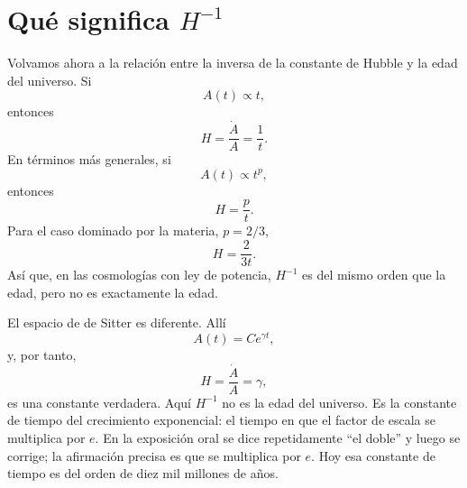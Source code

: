 \section{Qué significa \(H^{-1}\)}

Volvamos ahora a la relación entre la inversa de la constante de Hubble y la edad del universo. Si
\begin{equation}
A(t)\propto t,
\end{equation}
entonces
\begin{equation}
H=\frac{\dot A}{A}=\frac{1}{t}.
\end{equation}
En términos más generales, si
\begin{equation}
A(t)\propto t^p,
\end{equation}
entonces
\begin{equation}
H=\frac{p}{t}.
\end{equation}
Para el caso dominado por la materia, \(p=2/3\),
\begin{equation}
H=\frac{2}{3t}.
\end{equation}
Así que, en las cosmologías con ley de potencia, \(H^{-1}\) es del mismo orden que la edad, pero no es exactamente la edad.

El espacio de de Sitter es diferente. Allí
\begin{equation}
A(t)=C e^{\gamma t},
\end{equation}
y, por tanto,
\begin{equation}
H=\frac{\dot A}{A}=\gamma,
\end{equation}
es una constante verdadera. Aquí \(H^{-1}\) no es la edad del universo. Es la constante de tiempo del crecimiento exponencial: el tiempo en que el factor de escala se multiplica por \(e\). En la exposición oral se dice repetidamente ``el doble'' y luego se corrige; la afirmación precisa es que se multiplica por \(e\). Hoy esa constante de tiempo es del orden de diez mil millones de años.

\begin{classroomqa}
\end{classroomqa}


